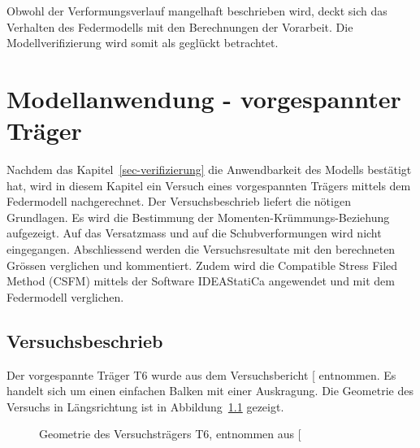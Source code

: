 \documentclass[
  11pt,
  letterpaper,
]{scrreprt}
\begin{document}
Obwohl der Verformungsverlauf mangelhaft beschrieben wird, deckt sich
das Verhalten des Federmodells mit den Berechnungen der Vorarbeit. Die
Modellverifizierung wird somit als geglückt betrachtet.


\chapter{Modellanwendung - vorgespannter
Träger}\label{modellanwendung---vorgespannter-truxe4ger}

Nachdem das Kapitel~\ref{sec-verifizierung} die Anwendbarkeit des
Modells bestätigt hat, wird in diesem Kapitel ein Versuch eines
vorgespannten Trägers mittels dem Federmodell nachgerechnet. Der
Versuchsbeschrieb liefert die nötigen Grundlagen. Es wird die Bestimmung
der Momenten-Krümmungs-Beziehung aufgezeigt. Auf das Versatzmass und auf
die Schubverformungen wird nicht eingegangen. Abschliessend werden die
Versuchsresultate mit den berechneten Grössen verglichen und
kommentiert. Zudem wird die Compatible Stress Filed Method (CSFM)
mittels der Software IDEAStatiCa angewendet und mit dem Federmodell
verglichen.

\section{Versuchsbeschrieb}\label{versuchsbeschrieb-2}

Der vorgespannte Träger T6 wurde aus dem Versuchsbericht
{[}\citeproc{ref-sigrist_versuche_1993}{5}{]} entnommen. Es handelt sich
um einen einfachen Balken mit einer Auskragung. Die Geometrie des
Versuchs in Längsrichtung ist in Abbildung~\ref{fig-geometrie_t6}
gezeigt.

\begin{figure}[H]


\caption{\label{fig-geometrie_t6}Geometrie des Versuchsträgers T6,
entnommen aus {[}\citeproc{ref-sigrist_versuche_1993}{5}{]}}

\end{figure}%
\end{document}
